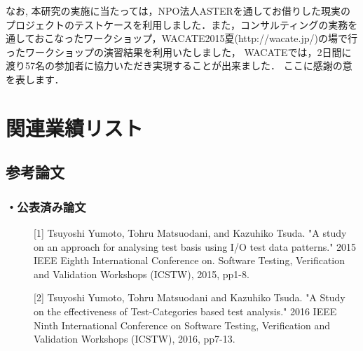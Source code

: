 \documentclass[a4paper,12pt]{jreport}
\begin{document}
なお, 本研究の実施に当たっては，NPO法人ASTERを通してお借りした現実のプロジェクトのテストケースを利用しました．また，コンサルティングの実務を通しておこなったワークショップ，WACATE2015夏(http://wacate.jp/)の場で行ったワークショップの演習結果を利用いたしました，
WACATEでは，2日間に渡り57名の参加者に協力いただき実現することが出来ました．
ここに感謝の意を表します．

\cite{hutchins1994experiments}
\cite{rothermel2001prioritizing}
\cite{fosdick1976data}
\cite{rapps1982data}
\cite{rapps1985selecting}
\cite{farooq2013empirical}
\cite{weinberg2008perfect}
\cite{elbaum2002test}
\cite{elbaum2000prioritizing}
\cite{stocks1996framework}
\cite{young2008software}
\cite{briand2002uml}
\cite{rothermel2002empirical}
\cite{ammann2016introduction}
\cite{Basili:2006:EDS:1134285.1134291}
\cite{demillo1978hints}
\cite{yumoto2017IEEJ}
\cite{lehmann2000test}
\cite{yumoto2015IPA}
\cite{grochtmann1993classification}
\cite{yumoto2017SS}
\cite{yumoto2017SS}
\cite{yumoto2017ICST}
\cite{ural1987test}
\cite{morisaki2016}
\cite{yumoto2014}
\cite{ammann1994using}
\cite{masuda2015semantic}
\cite{masuda2016detecting}
\cite{uetsuki2013efficient}
\cite{uetsuki2017improvement}
\cite{uetsuki2011software}
\cite{uetsuki2012decision}
\cite{briand2002uml}
\cite{rehman2007testing}
\cite{bertolino2007software}
\cite{kaner2008lessons}
\cite{itkonen2009testers}
\cite{rooksby2009testing}
\cite{simizu2009}
\cite{tj2005}
\cite{simizu2005}
\cite{matsuodani2004evaluation}
\cite{beer2008role}
\cite{gao2003testing}
\cite{beizer1995black}
\cite{lewis2016software}


  
  

\chapter*{関連業績リスト}
\section*{参考論文}
\subsection*{・公表済み論文}
\begin{description}
  \item[] [1] Tsuyoshi Yumoto, Tohru Matsuodani, and Kazuhiko Tsuda. "A study on an approach for analysing test basis using I/O test data patterns." 2015 IEEE Eighth International Conference on. Software Testing, Verification and Validation Workshops (ICSTW), 2015, pp1-8.
  \item[] [2] Tsuyoshi Yumoto, Tohru Matsuodani and Kazuhiko Tsuda. "A Study on the effectiveness of Test-Categories based test analysis." 2016 IEEE Ninth International Conference on Software Testing, Verification and Validation Workshops (ICSTW), 2016, pp7-13.
\end{description}
\end{document}
